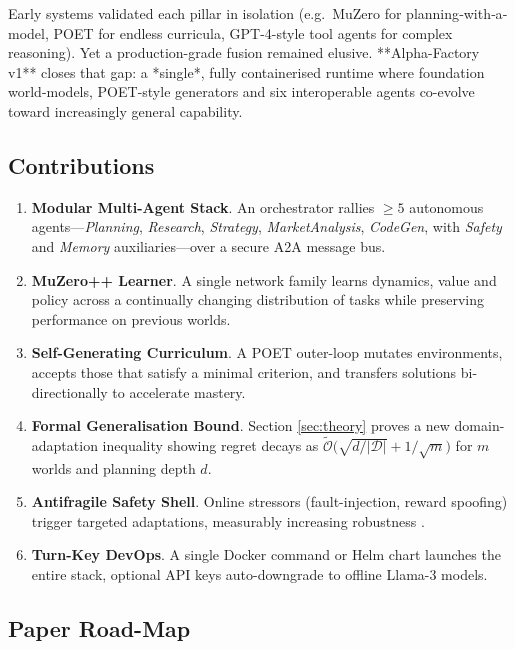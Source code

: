 Early systems validated each pillar in isolation (e.g.\ MuZero for
planning‐with‐a‐model, POET for endless curricula, GPT-4-style tool agents for
complex reasoning).  Yet a production-grade fusion remained elusive.  
**Alpha-Factory v1** closes that gap: a *single*, fully containerised runtime
where foundation world-models, POET-style generators and six interoperable
agents co-evolve toward increasingly general capability.

\subsection{Contributions}

\begin{enumerate}[label=\textbf{C\arabic*}.]
  \item \textbf{Modular Multi-Agent Stack}.  
        An orchestrator rallies $\ge 5$ autonomous agents—\emph{Planning},
        \emph{Research}, \emph{Strategy}, \emph{MarketAnalysis},
        \emph{CodeGen}, with \emph{Safety} and \emph{Memory} auxiliaries—over
        a secure \textsc{A2A} message bus.
  \item \textbf{MuZero++ Learner}.  
        A single network family learns dynamics, value and policy across a
        continually changing distribution of tasks while preserving
        performance on previous worlds.
  \item \textbf{Self-Generating Curriculum}.  
        A POET outer-loop mutates environments, accepts those that satisfy a
        minimal criterion, and transfers solutions bi-directionally to
        accelerate mastery.
  \item \textbf{Formal Generalisation Bound}.  
        Section \ref{sec:theory} proves a new domain-adaptation inequality
        showing regret decays as
        $\tilde{\mathcal O}\!\bigl(\sqrt{d/|\mathcal D|}+1/\sqrt m\bigr)$ for
        $m$ worlds and planning depth $d$.
  \item \textbf{Antifragile Safety Shell}.  
        Online stressors (fault-injection, reward spoofing) trigger targeted
        adaptations, measurably increasing robustness
        \parencite{amodei2016concrete,taleb2012antifragile}.
  \item \textbf{Turn-Key DevOps}.  
        A single Docker command or Helm chart launches the entire stack,
        optional API keys auto-downgrade to offline Llama-3 models.
\end{enumerate}

\subsection{Paper Road-Map}

